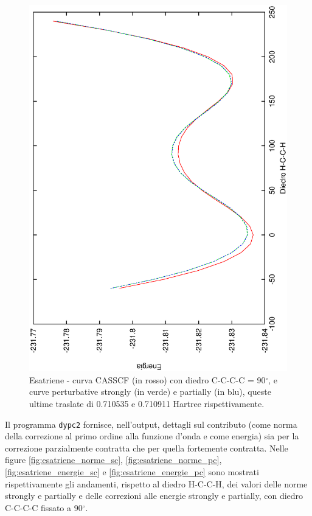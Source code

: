 \begin{figure}[ht]
\begin{center}
\includegraphics[angle=270,width=12cm,keepaspectratio]{immagini/esatriene/perturb_c90.eps}
\caption{\small Esatriene - curva CASSCF (in rosso) con diedro C-C-C-C = 90$^{\circ}$, e curve perturbative
strongly (in verde) e partially (in blu), queste ultime traslate di 0.710535 e 0.710911 Hartree rispettivamente.}
\label{fig:esatriene_perturb_c90}
\end{center}
\end{figure}

\clearpage
\pagebreak

Il programma \texttt{dypc2} fornisce, nell'output, dettagli sul contributo
(come norma della correzione al primo ordine alla funzione d'onda e come energia)
sia per la correzione parzialmente contratta che
per quella fortemente contratta. Nelle figure \ref{fig:esatriene_norme_sc},
\ref{fig:esatriene_norme_pc}, \ref{fig:esatriene_energie_sc} e
\ref{fig:esatriene_energie_pc} sono mostrati rispettivamente gli andamenti,
rispetto al diedro H-C-C-H, dei valori delle norme strongly e partially e
delle correzioni alle energie strongly e partially, con diedro C-C-C-C
fissato a 90$^{\circ}$.

